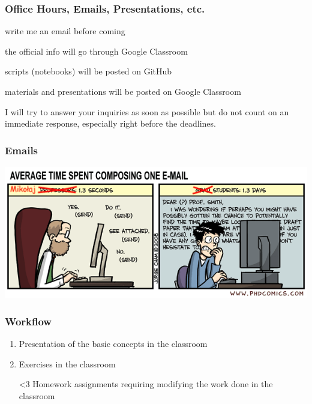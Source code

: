 \documentclass{beamer}
\begin{document}
\begin{frame}
    \frametitle{Office Hours, Emails, Presentations, etc.}
    \begin{description}
        \item [Office Hours:] write me an email before coming
        \item [Emails:] the official info will go through Google Classroom
        \item [GitHub:] scripts (notebooks) will be posted on GitHub
        \item [Google Classroom:] materials and presentations will be posted on
        Google Classroom
    \end{description}
    \alert{I will try to answer your inquiries as soon as possible but do not
    count on an immediate response, especially right before the deadlines.}
\end{frame}
\begin{frame}
    \frametitle{Emails}
        \includegraphics[width = \textwidth]{emails.png}
\end{frame}
\begin{frame}
    \frametitle{Workflow}
    \begin{enumerate}
        \item Presentation of the basic concepts in the classroom
        \item Exercises in the classroom
        \item [<3] Homework assignments requiring modifying the work done in the classroom
    \end{enumerate}
\end{frame}
\end{document}
